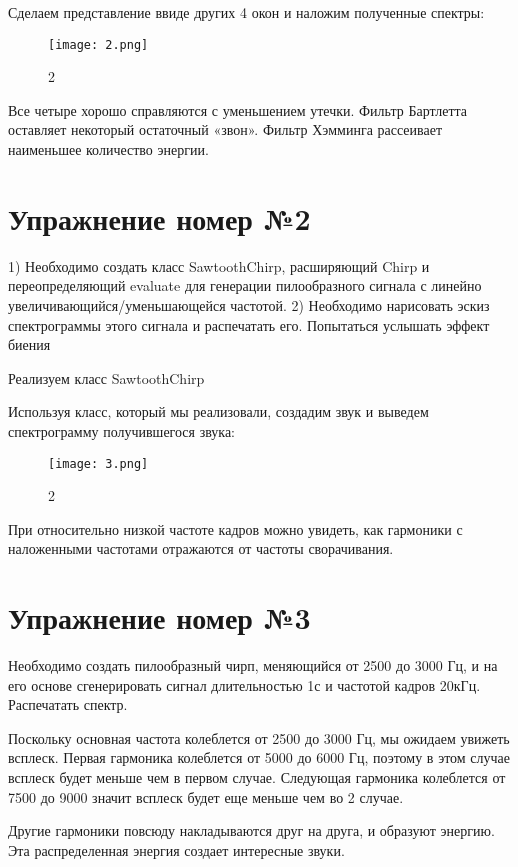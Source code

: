 ﻿\documentclass[10pt,a4paper,oneside]{article}
\begin{document}
Сделаем представление ввиде других 4 окон и наложим полученные спектры: 

\begin{figure}[H]
        \centering
        \texttt{[image: 2.png]}
        \caption{2}
        \label{fig:first}
\end{figure}

Все четыре хорошо справляются с уменьшением утечки. Фильтр Бартлетта оставляет некоторый остаточный «звон». Фильтр Хэмминга рассеивает наименьшее количество энергии.

\section{Упражнение номер №2}

1) Необходимо создать класс SawtoothChirp, расширяющий Chirp и переопределяющий evaluate для генерации пилообразного сигнала с линейно увеличивающийся/уменьшающейся частотой.
2) Необходимо нарисовать эскиз спектрограммы этого сигнала и распечатать его. Попытаться услышать эффект биения

Реализуем класс SawtoothChirp

Используя класс, который мы реализовали, создадим звук и выведем спектрограмму получившегося звука: 

\begin{figure}[H]
        \centering
        \texttt{[image: 3.png]}
        \caption{2}
        \label{fig:first}
\end{figure}

При относительно низкой частоте кадров можно увидеть, как гармоники с наложенными частотами отражаются от частоты сворачивания.

\section{Упражнение номер №3}

Необходимо создать пилообразный чирп, меняющийся от 2500 до 3000 Гц, и на его основе сгенерировать сигнал длительностью 1с и частотой кадров 20кГц. Распечатать спектр.

Поскольку основная частота колеблется от 2500 до 3000 Гц, мы ожидаем увижеть всплеск. Первая гармоника колеблется от 5000 до 6000 Гц, поэтому в этом случае всплеск будет меньше чем в первом случае. Следующая гармоника колеблется от 7500 до 9000 значит всплеск будет еще меньше чем во 2 случае.

Другие гармоники повсюду накладываются друг на друга, и образуют энергию. Эта распределенная энергия создает интересные звуки.
 
\end{document}
